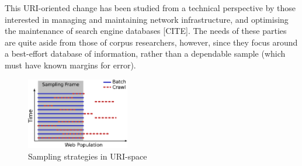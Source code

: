 \documentclass[11pt]{article}
\begin{document}
This URI-oriented change has been studied from a technical perspective by those interested in managing and maintaining network infrastructure, and optimising the maintenance of search engine databases [CITE].  The needs of these parties are quite aside from those of corpus researchers, however, since they focus around a best-effort database of information, rather than a dependable sample (which must have known margins for error).
% 
% 
\begin{figure}[b]
\centering
\includegraphics[width=0.4\textwidth]{images/samples.eps}
\caption{Sampling strategies in URI-space}
\label{fig:sampling}
\end{figure}
\end{document}
